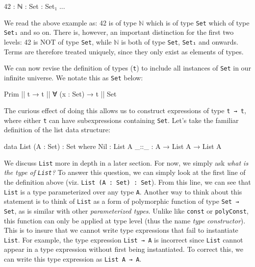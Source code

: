 \documentclass[12pt]{article}
\begin{document}
\begin{center}
\begin{minipage}{0.4\textwidth}
\begin{code}
42 : ℕ : Set : Set₁ ...
\end{code}
\end{minipage}
\end{center}

We read the above example as: 42 is of type \(\mathbb{N}\) which is of type
{\tt Set} which of type {\tt Set₁} and so on. There is, however, an important
distinction for the first two levels: 42 is NOT of type {\tt Set}, while
\(\mathbb{N}\) is both of type {\tt Set}, {\tt Set₁} and onwards. Terms are
therefore treated uniquely, since they only exist as elements of types.

We can now revise the definition of types ({\tt t}) to include all instances of
{\tt Set} in our infinite universe. We notate this as {\tt Set} below:

\begin{center}
\begin{minipage}{0.65\textwidth}
\begin{code}
Prim || t → t || ∀ (x : Set) → t || Set
\end{code}
\end{minipage}
\end{center}
The curious effect of doing this allows us to construct expressions of type
\mbox{{\tt t → t}}, where either {\tt t} can have subexpressions containing {\tt Set}.
Let's take the familiar definition of the list data structure:

\begin{center}
\begin{minipage}{0.65\textwidth}
\begin{code}
data List (A : Set) : Set where
  Nil  : List A
  _::_ : A → List A → List A
\end{code}
\end{minipage}
\end{center}

We discuss {\tt List} more in depth in a later section. For now, we simply ask
{\em what is the type of {\tt List}?} To answer this question, we can simply
look at the first line of the definition above (viz. {\tt List (A : Set) : Set}).
From this line, we can see that {\tt List} is a type parameterized over any type
{\tt A}. Another way to think about this statement is to think of {\tt List} as
a form of polymorphic function of type {\tt Set → Set}, as is similar with other
{\em parameterized types}. Unlike like {\tt const} or {\tt polyConst}, this
function can only be applied at type level (thus the name {\em type constructor}).
This is to insure that we cannot write type expressions that fail to instantiate
{\tt List}. For example, the type expression {\tt List → A} is incorrect since
{\tt List} cannot appear in a type expression without first being instantiated.
To correct this, we can write this type expression as {\tt List A → A}.
\end{document}
